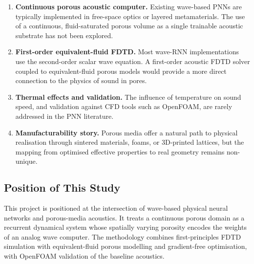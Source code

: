 \begin{enumerate}
    \item \textbf{Continuous porous acoustic computer.} Existing wave-based PNNs are typically implemented in free-space optics or layered metamaterials. The use of a continuous, fluid-saturated porous volume as a single trainable acoustic substrate has not been explored.
    \item \textbf{First-order equivalent-fluid FDTD.} Most wave-RNN implementations use the second-order scalar wave equation. A first-order acoustic FDTD solver coupled to equivalent-fluid porous models would provide a more direct connection to the physics of sound in pores.
    \item \textbf{Thermal effects and validation.} The influence of temperature on sound speed, and validation against CFD tools such as OpenFOAM, are rarely addressed in the PNN literature.
    \item \textbf{Manufacturability story.} Porous media offer a natural path to physical realisation through sintered materials, foams, or 3D-printed lattices, but the mapping from optimised effective properties to real geometry remains non-unique.
\end{enumerate}

\subsection{Position of This Study}
\label{subsec:position}

This project is positioned at the intersection of wave-based physical neural networks and porous-media acoustics. It treats a continuous porous domain as a recurrent dynamical system whose spatially varying porosity encodes the weights of an analog wave computer. The methodology combines first-principles FDTD simulation with equivalent-fluid porous modelling and gradient-free optimisation, with OpenFOAM validation of the baseline acoustics.
